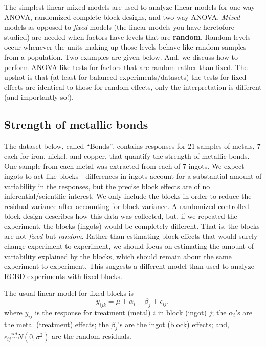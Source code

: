 \documentclass[
]{book}
\begin{document}
The simplest linear mixed models are used to analyze linear models for one-way ANOVA, randomized complete block designs, and two-way ANOVA. \emph{Mixed} models as opposed to \emph{fixed} models (the linear models you have heretofore studied) are needed when factors have levels that are \textbf{random}. Random levels occur whenever the units making up those levels behave like random samples from a population. Two examples are given below. And, we discuss how to perform ANOVA-like tests for factors that are random rather than fixed. The upshot is that (at least for balanced experiments/datasets) the tests for fixed effects are identical to those for random effects, only the interpretation is different (and importantly so!).

\hypertarget{strength-of-metallic-bonds}{%
\subsection{Strength of metallic bonds}\label{strength-of-metallic-bonds}}

The dataset below, called ``Bonds'', contains responses for 21 samples of metals, 7 each for iron, nickel, and copper, that quantify the strength of metallic bonds. One sample from each metal was extracted from each of 7 ingots. We expect ingots to act like blocks---differences in ingots account for a substantial amount of variability in the responses, but the precise block effects are of no inferential/scientific interest. We only include the blocks in order to reduce the residual variance after accounting for block variance. A randomized controlled block design describes how this data was collected, but, if we repeated the experiment, the blocks (ingots) would be completely different. That is, the blocks are not \emph{fixed} but \emph{random}. Rather than estimating block effects that would surely change experiment to experiment, we should focus on estimating the amount of variability explained by the blocks, which should remain about the same experiment to experiment. This suggests a different model than used to analyze RCBD experiments with fixed blocks.

The usual linear model for fixed blocks is
\[y_{ijk} = \mu + \alpha_i + \beta_j + \epsilon_{ij},\]
where \(y_{ij}\) is the response for treatment (metal) \(i\) in block (ingot) \(j\); the \(\alpha_i\)'s are the metal (treatment) effects; the \(\beta_j\)'s are the ingot (block) effects; and, \(\epsilon_{ij}\stackrel{iid}{\sim}N(0,\sigma^2)\) are the random residuals.
\end{document}
